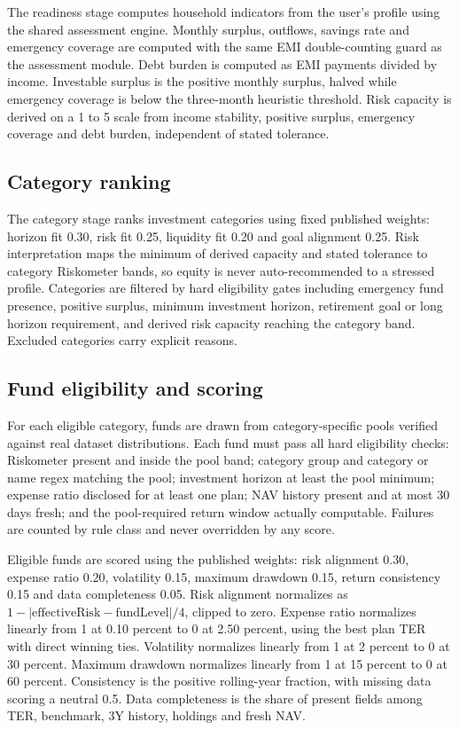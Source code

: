 The readiness stage computes household indicators from the user's profile using the shared assessment engine. Monthly surplus, outflows, savings rate and emergency coverage are computed with the same EMI double-counting guard as the assessment module. Debt burden is computed as EMI payments divided by income. Investable surplus is the positive monthly surplus, halved while emergency coverage is below the three-month heuristic threshold. Risk capacity is derived on a 1 to 5 scale from income stability, positive surplus, emergency coverage and debt burden, independent of stated tolerance.

\subsection{Category ranking}

The category stage ranks investment categories using fixed published weights: horizon fit 0.30, risk fit 0.25, liquidity fit 0.20 and goal alignment 0.25. Risk interpretation maps the minimum of derived capacity and stated tolerance to category Riskometer bands, so equity is never auto-recommended to a stressed profile. Categories are filtered by hard eligibility gates including emergency fund presence, positive surplus, minimum investment horizon, retirement goal or long horizon requirement, and derived risk capacity reaching the category band. Excluded categories carry explicit reasons.

\subsection{Fund eligibility and scoring}

For each eligible category, funds are drawn from category-specific pools verified against real dataset distributions. Each fund must pass all hard eligibility checks: Riskometer present and inside the pool band; category group and category or name regex matching the pool; investment horizon at least the pool minimum; expense ratio disclosed for at least one plan; NAV history present and at most 30 days fresh; and the pool-required return window actually computable. Failures are counted by rule class and never overridden by any score.

Eligible funds are scored using the published weights: risk alignment 0.30, expense ratio 0.20, volatility 0.15, maximum drawdown 0.15, return consistency 0.15 and data completeness 0.05. Risk alignment normalizes as $1 - |\text{effectiveRisk} - \text{fundLevel}| / 4$, clipped to zero. Expense ratio normalizes linearly from 1 at 0.10 percent to 0 at 2.50 percent, using the best plan TER with direct winning ties. Volatility normalizes linearly from 1 at 2 percent to 0 at 30 percent. Maximum drawdown normalizes linearly from 1 at 15 percent to 0 at 60 percent. Consistency is the positive rolling-year fraction, with missing data scoring a neutral 0.5. Data completeness is the share of present fields among TER, benchmark, 3Y history, holdings and fresh NAV.

